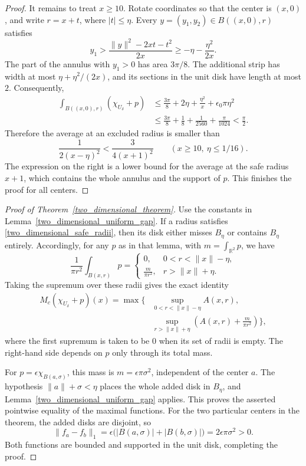 \documentclass[12pt]{amsart}
\numberwithin{equation}{section}
\begin{document}
\begin{proof}
It remains to treat $x\geq10$. Rotate coordinates so that the center
is $(x,0)$, and write $r=x+t$, where $|t|\leq\eta$.
Every $y=(y_1,y_2)\in B((x,0),r)$ satisfies
\[
y_1>\frac{\|y\|^2-2xt-t^2}{2x}
\geq-\eta-\frac{\eta^2}{2x}.
\]
The part of the annulus with $y_1>0$ has area $3\pi/8$.
The additional strip has width at most $\eta+\eta^2/(2x)$, and its
sections in the unit disk have length at most $2$. Consequently,
\begin{align*}
\int_{B((x,0),r)}(\chi_{U_\delta}+p)
&\leq\frac{3\pi}{8}+2\eta+\frac{\eta^2}{x}
       +\epsilon_0\pi\eta^2\\
&\leq\frac{3\pi}{8}+\frac18+\frac1{2560}+\frac{\pi}{1024}
 <\frac{\pi}{2}.
\end{align*}
Therefore the average at an excluded radius is smaller than
\[
\frac{1}{2(x-\eta)^2}
<\frac{3}{4(x+1)^2}\qquad(x\geq10,\ \eta\leq1/16).
\]
The expression on the right is a lower bound for the average at the
safe radius $x+1$, which contains the whole annulus and the support
of $p$. This finishes the proof for all centers.
\end{proof}

\begin{proof}[Proof of Theorem~\ref{two_dimensional_theorem}]
Use the constants in Lemma~\ref{two_dimensional_uniform_gap}.
If a radius satisfies \eqref{two_dimensional_safe_radii}, then its
disk either misses $B_\eta$ or contains $B_\eta$ entirely. Accordingly,
for any $p$ as in that lemma, with $m=\int_{\mathbb{R}^2}p$, we have
\[
\frac1{\pi r^2}\int_{B(x,r)}p=
\begin{cases}
0,&0<r<\|x\|-\eta,\\[2pt]
\displaystyle\frac{m}{\pi r^2},&r>\|x\|+\eta.
\end{cases}
\]
Taking the supremum over these radii gives the exact identity
\begin{equation}
\label{two_dimensional_common_maximal}
\begin{aligned}
M_c(\chi_{U_\delta}+p)(x)
=\max\Bigg\{&\sup_{0<r<\|x\|-\eta} A(x,r),\\
&\sup_{r>\|x\|+\eta}
\left(A(x,r)+\frac{m}{\pi r^2}\right)\Bigg\},
\end{aligned}
\end{equation}
where the first supremum is taken to be $0$ when its set of radii is
empty. The right-hand side depends on $p$ only through its total mass.

For $p=\epsilon\chi_{B(a,\sigma)}$, this mass is
$m=\epsilon\pi\sigma^2$, independent of the center $a$.
The hypothesis $\|a\|+\sigma<\eta$ places the whole added disk in
$B_\eta$, and Lemma~\ref{two_dimensional_uniform_gap} applies.
This proves the asserted pointwise equality of the maximal functions.
For the two particular centers in the theorem, the added disks are
disjoint, so
\[
\|f_a-f_b\|_1
=\epsilon\bigl(|B(a,\sigma)|+|B(b,\sigma)|\bigr)
=2\epsilon\pi\sigma^2>0.
\]
Both functions are bounded and supported in the unit disk, completing
the proof.
\end{proof}
\end{document}
